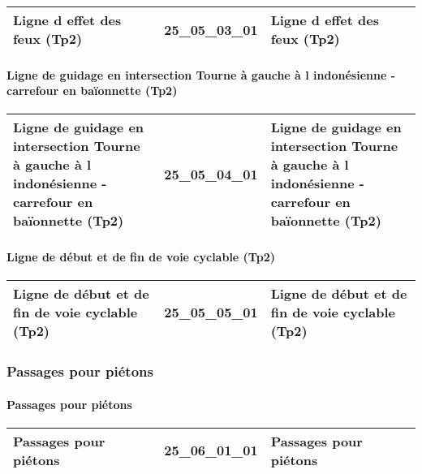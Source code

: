 \documentclass[12pt,titlepage,oneside]{book}
\begin{document}
\renewcommand{\arraystretch}{1.2}
\begin{supertabular}{|p{10cm}|c|p{15cm}|}
 Ligne d effet des feux (Tp2) & 25\_05\_03\_01 & Ligne d effet des feux (Tp2)\\
\hline
\end{supertabular}


\paragraph{Ligne de guidage en intersection Tourne à gauche à l indonésienne - carrefour en baïonnette (Tp2)}
\noindent
\vspace{\baselineskip}

\renewcommand{\arraystretch}{1.2}
\begin{supertabular}{|p{10cm}|c|p{15cm}|}
 Ligne de guidage en intersection Tourne à gauche à l indonésienne - carrefour en baïonnette (Tp2) & 25\_05\_04\_01 & Ligne de guidage en intersection Tourne à gauche à l indonésienne - carrefour en baïonnette (Tp2)\\
\hline
\end{supertabular}


\paragraph{Ligne de début et de fin de voie cyclable (Tp2)}
\noindent
\vspace{\baselineskip}

\renewcommand{\arraystretch}{1.2}
\begin{supertabular}{|p{10cm}|c|p{15cm}|}
 Ligne de début et de fin de voie cyclable (Tp2) & 25\_05\_05\_01 & Ligne de début et de fin de voie cyclable (Tp2)\\
\hline
\end{supertabular}

\subsubsection{\large Passages pour piétons}
\paragraph{Passages pour piétons}
\noindent
\vspace{\baselineskip}

\renewcommand{\arraystretch}{1.2}
\begin{supertabular}{|p{10cm}|c|p{15cm}|}
 Passages pour piétons & 25\_06\_01\_01 & Passages pour piétons\\
\hline
\end{supertabular}
\end{document}
